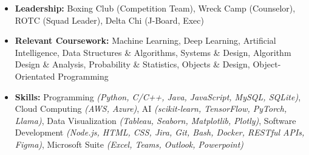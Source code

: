 \documentclass{article}
\begin{document}
\begin{flushleft}
\vspace{5pt}
    \vspace{3pt} 

    \begin{itemize}[noitemsep,topsep=0pt]
        \item 
    \textbf{Leadership:} Boxing Club (Competition Team),  Wreck Camp (Counselor), ROTC  (Squad Leader), Delta Chi (J-Board, Exec)  \vspace{3pt}

    \item 
    \textbf{Relevant Coursework:} Machine Learning, Deep Learning, Artificial Intelligence, Data Structures \& Algorithms, Systems \& Design, Algorithm Design \& Analysis, Probability \& Statistics, Objects \& Design, Object-Orientated Programming \vspace{3pt}

    \item 
    \textbf{Skills:} Programming \textit{(Python, C/C++, Java, JavaScript, MySQL, SQLite)}, Cloud Computing \textit{(AWS, Azure)}, AI \textit{(scikit-learn, TensorFlow, PyTorch, Llama)}, Data Visualization \textit{(Tableau, Seaborn, Matplotlib, Plotly)}, Software Development \textit{(Node.js, HTML, CSS, Jira, Git, Bash, Docker, RESTful APIs, Figma)}, Microsoft Suite \textit{(Excel, Teams, Outlook, Powerpoint)}
    \end{itemize}
    
\end{flushleft}
\end{document}
